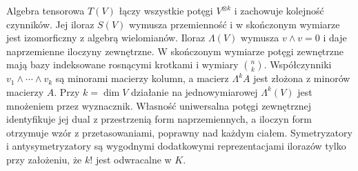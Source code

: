 Algebra tensorowa \(T(V)\)
łączy wszystkie potęgi
\(V^{\otimes k}\) i zachowuje
kolejność czynników.
Jej iloraz \(S(V)\) wymusza
przemienność i w skończonym
wymiarze jest izomorficzny
z algebrą wielomianów.
Iloraz \(\Lambda(V)\) wymusza
\(v\wedge v=0\) i daje
naprzemienne iloczyny zewnętrzne.
W skończonym wymiarze
potęgi zewnętrzne mają bazy
indeksowane rosnącymi krotkami
i wymiary \(\binom nk\).
Współczynniki
\(v_1\wedge\cdots\wedge v_k\)
są minorami macierzy kolumn,
a macierz \(\Lambda^k A\)
jest złożona z minorów
macierzy \(A\).
Przy \(k=\dim V\) działanie
na jednowymiarowej
\(\Lambda^k(V)\) jest mnożeniem
przez wyznacznik.
Własność uniwersalna
potęgi zewnętrznej
identyfikuje jej dual z
przestrzenią form naprzemiennych,
a iloczyn form otrzymuje
wzór z przetasowaniami,
poprawny nad każdym ciałem.
Symetryzatory i antysymetryzatory
są wygodnymi dodatkowymi
reprezentacjami ilorazów
tylko przy założeniu, że
\(k!\) jest odwracalne w \(K\).
